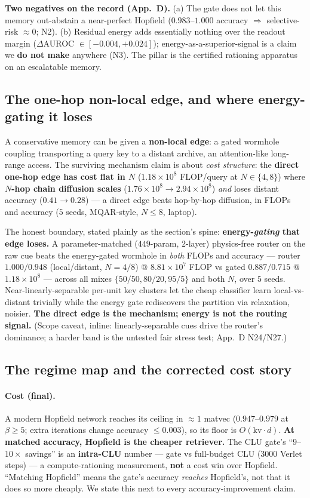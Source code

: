 \documentclass[11pt]{article}
\begin{document}
\textbf{Two negatives on the record (App.~D).} (a) The gate does not let this memory out-abstain a near-perfect Hopfield ($0.983$--$1.000$ accuracy $\Rightarrow$ selective-risk $\approx0$; N2). (b) Residual energy adds essentially nothing over the readout margin ($\Delta$AUROC $\in[-0.004,+0.024]$); energy-as-a-superior-signal is a claim we \textbf{do not make} anywhere (N3). The pillar is the certified rationing apparatus on an escalatable memory.

\subsection{The one-hop non-local edge, and where energy-gating it loses}
A conservative memory can be given a \textbf{non-local edge}: a gated wormhole coupling transporting a query key to a distant archive, an attention-like long-range access. The surviving mechanism claim is about \emph{cost structure}: the \textbf{direct one-hop edge has cost flat in $N$} ($1.18{\times}10^8$ FLOP/query at $N\in\{4,8\}$) where \textbf{$N$-hop chain diffusion scales} ($1.76{\times}10^8\to2.94{\times}10^8$) \emph{and} loses distant accuracy ($0.41\to0.28$) --- a direct edge beats hop-by-hop diffusion, in FLOPs and accuracy ($5$ seeds, MQAR-style, $N\le8$, laptop).

The honest boundary, stated plainly as the section's spine: \textbf{energy-\emph{gating} that edge loses.} A parameter-matched ($449$-param, $2$-layer) physics-free router on the raw cue beats the energy-gated wormhole in \emph{both} FLOPs and accuracy --- router $1.000/0.948$ (local/distant, $N=4/8$) @ $8.81{\times}10^7$ FLOP vs gated $0.887/0.715$ @ $1.18{\times}10^8$ --- across all mixes $\{50/50,80/20,95/5\}$ and both $N$, over $5$ seeds. Near-linearly-separable per-unit key clusters let the cheap classifier learn local-vs-distant trivially while the energy gate rediscovers the partition via relaxation, noisier. \textbf{The direct edge is the mechanism; energy is not the routing signal.} (Scope caveat, inline: linearly-separable cues drive the router's dominance; a harder band is the untested fair stress test; App.~D N24/N27.)

\subsection{The regime map and the corrected cost story}
\paragraph{Cost (final).} A modern Hopfield network reaches its ceiling in $\approx1$ matvec ($0.947$--$0.979$ at $\beta\ge5$; extra iterations change accuracy $\le0.003$), so its floor is $O(\text{kv}\cdot d)$. \textbf{At matched accuracy, Hopfield is the cheaper retriever.} The CLU gate's ``$9$--$10\times$ savings'' is an \textbf{intra-CLU} number --- gate vs full-budget CLU ($3000$ Verlet steps) --- a compute-rationing measurement, \textbf{not} a cost win over Hopfield. ``Matching Hopfield'' means the gate's accuracy \emph{reaches} Hopfield's, not that it does so more cheaply. We state this next to every accuracy-improvement claim.
\end{document}
